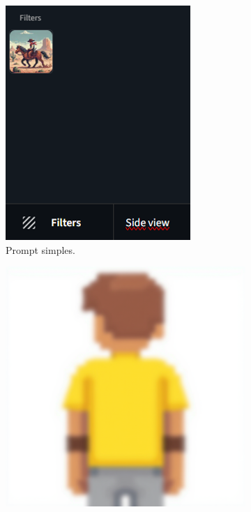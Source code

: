 \begin{figure}[htbp]
    \begin{subfigure}{0.35\linewidth}
        \centering
        \includegraphics[width=1\linewidth]{figs/cgDream/tela_char_FluxFast_filtro2.PNG}
        \caption{\small Prompt simples.}
        \label{fig:cgDream9c}
    \end{subfigure}
    \begin{subfigure}{0.45\linewidth}
        \centering
        \includegraphics[width=1\linewidth]{figs/cgDream/res_char_FluxFast_filtro2.PNG}

\end{subfigure}
\end{figure}
